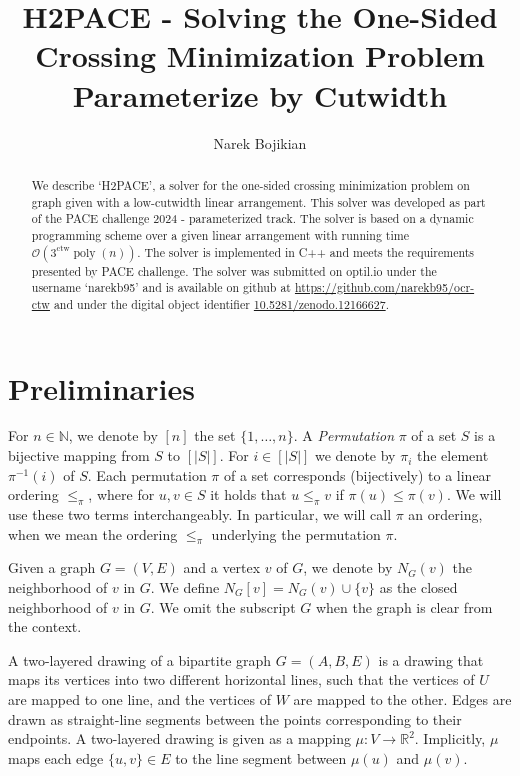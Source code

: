 \documentclass[a4paper,UKenglish,cleveref, autoref, thm-restate]{lipics-v2021}
\title{H2PACE - Solving the One-Sided Crossing Minimization Problem Parameterize by Cutwidth} %
\author{Narek Bojikian}{Humboldt University of Berlin, Germany}{bojikian@informatik.hu-berlin.de}{https://orcid.org/0000-0003-1072-4873}{}%
\newcommand{\layerone}{\ensuremath{U}}
\newcommand{\layertwo}{\ensuremath{W}}
\begin{document}
\maketitle

\begin{abstract}
    We describe `H2PACE', a solver for the one-sided crossing minimization problem on graph given with a low-cutwidth linear arrangement.
    This solver was developed as part of the PACE challenge 2024 - parameterized track. The solver is based on a dynamic programming scheme over a given linear arrangement with running time $\mathcal{O}(3^{\operatorname{ctw}}\operatorname{poly}(n))$. The solver is implemented in C++ and meets the requirements presented by PACE challenge. The solver was submitted on optil.io under the username `narekb95' and is available on github at \url{https://github.com/narekb95/ocr-ctw} and under the digital object identifier \href{https://zenodo.org/records/12166628}{10.5281/zenodo.12166627}.
\end{abstract}
\section{Preliminaries}
For $n\in \mathbb{N}$, we denote by $[n]$ the set $\{1,\dots,n\}$.
A \emph{Permutation} $\pi$ of a set $S$ is a bijective mapping from $S$ to $[|S|]$. For $i\in[|S|]$ we denote by $\pi_i$ the element $\pi^{-1}(i)$ of $S$. Each permutation $\pi$ of a set corresponds (bijectively) to a linear ordering $\leq_{\pi}$, where for $u,v\in S$ it holds that $u\leq_{\pi} v$ if $\pi(u)\leq \pi(v)$. We will use these two terms interchangeably. In particular, we will call $\pi$ an ordering, when we mean the ordering $\leq_{\pi}$ underlying the permutation $\pi$.

Given a graph $G = (V,E)$ and a vertex $v$ of $G$, we denote by $N_G(v)$ the neighborhood of $v$ in $G$. We define $N_G[v] = N_G(v)\cup \{v\}$ as the closed neighborhood of $v$ in $G$. We omit the subscript $G$ when the graph is clear from the context.

A two-layered drawing of a bipartite graph $G=(A,B,E)$ is a drawing that maps its vertices into two different horizontal lines, such that the vertices of $\layerone$ are mapped to one line, and the vertices of $\layertwo$ are mapped to the other. Edges are drawn as straight-line segments between the points corresponding to their endpoints. A two-layered drawing is given as a mapping $\mu\colon V\rightarrow \mathbb{R}^2$. Implicitly, $\mu$ maps each edge $\{u,v\} \in E$ to the line segment between $\mu(u)$ and $\mu(v)$.
\end{document}
